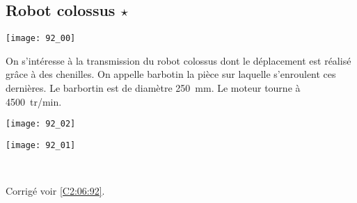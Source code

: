 \normaltrue \difficilefalse \tdifficilefalse
\correctionfalse


\subsection*{Robot colossus $\star$ \label{C2:06:92}}
\setcounter{question}{0}


\ifcorrection
\else
{}
\fi

\ifprof
\else


\begin{marginfigure}
\texttt{[image: 92\_00]}
\end{marginfigure}
On s'intéresse à la transmission du robot colossus dont le déplacement est réalisé grâce à des chenilles. On appelle barbotin la pièce sur laquelle s'enroulent ces dernières. Le barbortin est de diamètre \SI{250}{mm}.
Le moteur tourne à \SI{4500}{tr/min}.

\begin{marginfigure}
\texttt{[image: 92\_02]}
\end{marginfigure}

\begin{center}
\texttt{[image: 92\_01]}
\end{center}


\fi




\ifprof
\else
\fi

\ifprof ~\\

\else
\fi


\ifprof
\else
\begin{flushright}
\footnotesize{Corrigé  voir \ref{C2:06:92}.}
\end{flushright}%
\fi